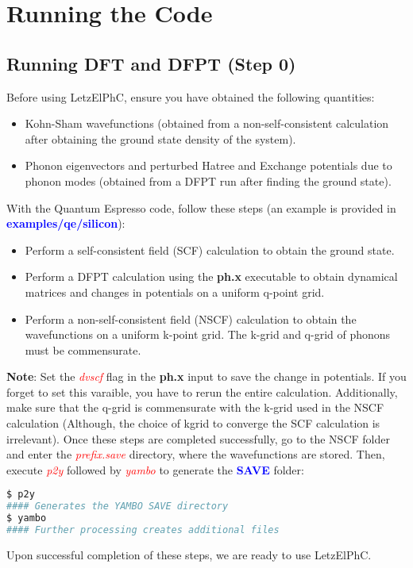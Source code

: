 \documentclass[12pt,twoside,openany]{book}
\begin{document}
\chapter{Running the Code}
\section{Running DFT and DFPT (Step 0)}
Before using LetzElPhC, ensure you have obtained the following quantities: 
\begin{itemize}
\item Kohn-Sham wavefunctions (obtained from a non-self-consistent calculation after obtaining the ground state density of the system).
\item Phonon eigenvectors and perturbed Hatree and Exchange potentials due to phonon modes (obtained from a DFPT run after finding the ground state).
\end{itemize}
With the Quantum Espresso code, follow these steps (an example is provided in \textcolor{blue}{\bf{examples/qe/silicon}}):
\begin{itemize}
\item Perform a self-consistent field (SCF) calculation to obtain the ground state.
\item Perform a DFPT calculation using the \textbf{ph.x} executable to obtain dynamical matrices and changes in potentials on a uniform q-point grid.
\item Perform a non-self-consistent field (NSCF) calculation to obtain the wavefunctions on a uniform k-point grid. The k-grid and q-grid of phonons 
must be commensurate.
\end{itemize}
\textbf{Note}: Set the \textcolor{red}{\emph{dvscf}} flag in the \textbf{ph.x} input to save the change in potentials. If you forget to set this varaible,
you have to rerun the entire calculation. 
Additionally, make sure that the q-grid is commensurate with the k-grid used in the NSCF calculation (Although, the choice of kgrid to converge the SCF calculation is irrelevant).
Once these steps are completed successfully, go to the NSCF folder and enter the \textcolor{red}{\emph{prefix.save}} directory, 
where the wavefunctions are stored. Then, execute \textcolor{red}{\emph{p2y}} followed by \textcolor{red}{\emph{yambo}} to generate the \textcolor{blue}{\bf{SAVE}} folder:
\begin{lstlisting}[language=bash]
$ p2y
#### Generates the YAMBO SAVE directory
$ yambo
#### Further processing creates additional files
\end{lstlisting}
Upon successful completion of these steps, we are ready to use LetzElPhC.
\end{document}
